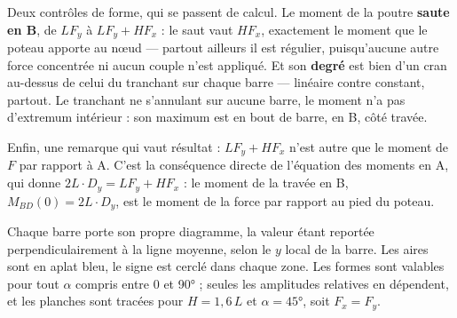Deux contrôles de forme, qui se passent de calcul. Le moment de la poutre \textbf{saute en B}, de $LF_y$ à $LF_y + HF_x$ : le saut vaut $HF_x$, exactement le moment que le poteau apporte au nœud — partout ailleurs il est régulier, puisqu'aucune autre force concentrée ni aucun couple n'est appliqué. Et son \textbf{degré} est bien d'un cran au-dessus de celui du tranchant sur chaque barre — linéaire contre constant, partout. Le tranchant ne s'annulant sur aucune barre, le moment n'a pas d'extremum intérieur : son maximum est en bout de barre, en B, côté travée.

Enfin, une remarque qui vaut résultat : $LF_y + HF_x$ n'est autre que le moment de $F$ par rapport à A. C'est la conséquence directe de l'équation des moments en A, qui donne $2L\cdot D_y = LF_y + HF_x$ : le moment de la travée en B, $M_{BD}(0) = 2L\cdot D_y$, est le moment de la force par rapport au pied du poteau.


Chaque barre porte son propre diagramme, la valeur étant reportée perpendiculairement à la ligne moyenne, selon le $y$ local de la barre. Les aires sont en aplat bleu, le signe est cerclé dans chaque zone. Les formes sont valables pour tout $\alpha$ compris entre 0 et 90° ; seules les amplitudes relatives en dépendent, et les planches sont tracées pour $H = 1{,}6\,L$ et $\alpha = 45°$, soit $F_x = F_y$.

